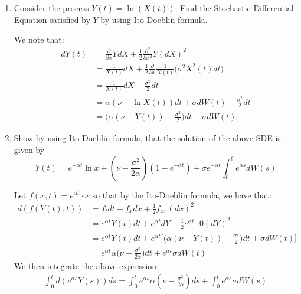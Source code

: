 \documentclass[12pt,twoside, letter]{exam}
\theoremstyle{definition}
\begin{document}
  \begin{enumerate}
    \item Consider the process $Y(t) = \ln(X(t))$; Find the Stochastic Differential Equation satisfied by $Y$ by using Ito-Doeblin formula.
      \begin{solution}
        We note that:
          \begin{align*}
            dY(t) &= \frac{\partial}{\partial x}Y dX +  \frac{1}{2} \frac{\partial^2}{\partial x^2}Y (dX)^2 \\
            &= \frac{1}{X(t)} dX + \frac{1}{2} \frac{\partial}{\partial x} \frac{1}{X(t)} \bigg(\sigma^2 X^2(t) dt \bigg) \\
            &= \frac{1}{X(t)} dX - \frac{\sigma^2}{2} dt \\
            &=  \alpha (\nu - \ln{X(t)})dt + \sigma dW(t) - \frac{\sigma^2}{2} dt \\
            &=  \Bigg(\alpha (\nu - Y(t)) - \frac{\sigma^2}{2} \Bigg)dt + \sigma dW(t)
          \end{align*}
      \end{solution}
    \item Show by using Ito-Doeblin formula, that the solution of the above SDE is given by
      \begin{equation*}
        Y(t) = e^{-\alpha t} \ln{x} + (\nu - \frac{\sigma^2}{2\alpha})(1-e^{-\alpha t}) + \sigma e^{-\alpha t}\int^t_0 e^{\alpha s}dW(s)
      \end{equation*}
      \begin{solution}
        Let $f(x,t) = e^{\alpha t}\cdot x$ so that by the Ito-Doeblin formula, we have that:
        \begin{align*}
          d(f(Y(t),t)) &= f_t dt + f_x dx + \frac{1}{2} f_{xx} (dx)^2 \\
          &= e^{\alpha t}Y(t) dt + e^{\alpha t}dY + \frac{1}{2} e^{\alpha t} \cdot 0 (dY)^2 \\
          &= e^{\alpha t}Y(t) dt + e^{\alpha t}\Bigg[\bigg(\alpha (\nu - Y(t)) - \frac{\sigma^2}{2} \bigg)dt + \sigma dW(t)\Bigg] \\
          &= e^{\alpha t} \alpha \bigg(\nu - \frac{\sigma^2}{2\alpha} \bigg)dt + e^{\alpha t}\sigma dW(t)
        \end{align*}
        We then integrate the above expression:
        \begin{align*}
          \int^t_0 d(e^{\alpha s} Y(s)) ds
          = \int^t_0 e^{\alpha s} \alpha (\nu - \frac{\sigma^2}{2\alpha})ds + \int^t_0 e^{\alpha s}\sigma dW(s) \\

\end{align*}
\end{solution}
\end{enumerate}
\end{document}
